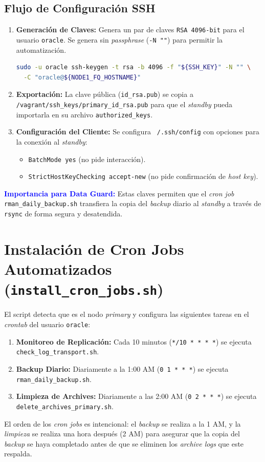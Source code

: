 \documentclass[11pt, a4paper]{report}
\newcommand{\destacado}[1]{\textbf{\textcolor{blue}{#1}}}
\begin{document}
\subsection{Flujo de Configuración SSH}
\begin{enumerate}
    \item \textbf{Generación de Claves:} Genera un par de claves \texttt{RSA 4096-bit} para el usuario \texttt{oracle}.
Se genera sin \textit{passphrase} (\texttt{-N ""}) para permitir la automatización.
\begin{lstlisting}[language=bash, caption={Generación de Claves RSA}]
sudo -u oracle ssh-keygen -t rsa -b 4096 -f "${SSH_KEY}" -N "" \
  -C "oracle@${NODE1_FQ_HOSTNAME}"
        \end{lstlisting}
    \item \textbf{Exportación:} La clave pública (\texttt{id\_rsa.pub}) se copia a \texttt{/vagrant/ssh\_keys/primary\_id\_rsa.pub} para que el \textit{standby} pueda importarla en su archivo \texttt{authorized\_keys}.
\item \textbf{Configuración del Cliente:} Se configura \texttt{~/.ssh/config} con opciones para la conexión al \textit{standby}:
        \begin{itemize}
            \item \texttt{BatchMode yes} (no pide interacción).
\item \texttt{StrictHostKeyChecking accept-new} (no pide confirmación de \textit{host key}).
        \end{itemize}
\end{enumerate}
\destacado{Importancia para Data Guard:} Estas claves permiten que el \textit{cron job} \texttt{rman\_daily\_backup.sh} transfiera la copia del \textit{backup} diario al \textit{standby} a través de \texttt{rsync} de forma segura y desatendida.
\section{Instalación de Cron Jobs Automatizados (\texttt{install\_cron\_jobs.sh})}

El script detecta que es el nodo \textit{primary} y configura las siguientes tareas en el \textit{crontab} del usuario \texttt{oracle}:
\begin{enumerate}
    \item \textbf{Monitoreo de Replicación:} Cada 10 minutos (\texttt{*/10 * * * *}) se ejecuta \texttt{check\_log\_transport.sh}.
\item \textbf{Backup Diario:} Diariamente a la 1:00 AM (\texttt{0 1 * * *}) se ejecuta \texttt{rman\_daily\_backup.sh}.
\item \textbf{Limpieza de Archives:} Diariamente a las 2:00 AM (\texttt{0 2 * * *}) se ejecuta \texttt{delete\_archives\_primary.sh}.
\end{enumerate}
El orden de los \textit{cron jobs} es intencional: el \textit{backup} se realiza a la 1 AM, y la \textit{limpieza} se realiza una hora después (2 AM) para asegurar que la copia del \textit{backup} se haya completado antes de que se eliminen los \textit{archive logs} que este respalda.
\end{document}
